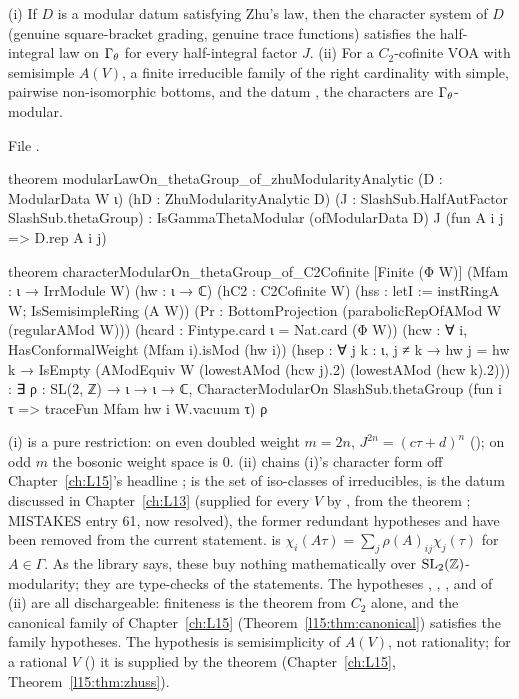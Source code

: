 \begin{theorem}\label{l14:thm:thetaboson}
(i) If $D$ is a modular datum satisfying Zhu's law, then the character system of $D$ (genuine square-bracket grading, genuine
trace functions) satisfies the half-integral law on $\Gamma_\theta$ for every half-integral factor $J$. (ii) For a $C_2$-cofinite VOA
with semisimple $A(V)$, a finite irreducible family of the right cardinality with simple, pairwise non-isomorphic bottoms,
and the datum , the characters are $\Gamma_\theta$-modular.
\end{theorem}
\noindent File .
\begin{leancode}
theorem modularLawOn_thetaGroup_of_zhuModularityAnalytic (D : ModularData W ι)
    (hD : ZhuModularityAnalytic D) (J : SlashSub.HalfAutFactor SlashSub.thetaGroup) :
    IsGammaThetaModular (ofModularData D) J (fun A i j => D.rep A i j)

theorem characterModularOn_thetaGroup_of_C2Cofinite [Finite (Φ W)]
    (Mfam : ι → IrrModule W) (hw : ι → ℂ)
    (hC2 : C2Cofinite W)
    (hss : letI := instRingA W; IsSemisimpleRing (A W))
    (Pr : BottomProjection (parabolicRepOfAMod W (regularAMod W)))
    (hcard : Fintype.card ι = Nat.card (Φ W))
    (hcw : ∀ i, HasConformalWeight (Mfam i).isMod (hw i))
    (hsep : ∀ j k : ι, j ≠ k → hw j = hw k →
      IsEmpty (AModEquiv W (lowestAMod (hcw j).2) (lowestAMod (hcw k).2))) :
    ∃ ρ : SL(2, ℤ) → ι → ι → ℂ,
      CharacterModularOn SlashSub.thetaGroup
        (fun i τ => traceFun Mfam hw i W.vacuum τ) ρ
\end{leancode}
\begin{dictionary}
(i) is a pure restriction: on even doubled weight $m=2n$, $J^{2n} = (c\tau+d)^n$ (); on odd $m$
the bosonic weight space is $0$. (ii) chains (i)'s character form off Chapter~\ref{ch:L15}'s headline
;  is the set of iso-classes of irreducibles, 
is the datum discussed in Chapter~\ref{ch:L13} (supplied for every $V$ by , from the theorem ; MISTAKES entry 61, now resolved),
the former redundant hypotheses  and  have been removed from the current statement.  is $\chi_i(A\tau) =
\sum_j\rho(A)_{ij}\chi_j(\tau)$ for $A\in\Gamma$. As the library says, these buy nothing mathematically over $\mathrm{SL}_2(\mathbb{Z})$-modularity;
they are type-checks of the statements. The hypotheses \lean{[Finite (Φ W)]}, , ,  and
 of (ii) are all dischargeable: finiteness is the theorem  from $C_2$ alone, and
the canonical family of Chapter~\ref{ch:L15} (Theorem~\ref{l15:thm:canonical}) satisfies the family hypotheses. The
hypothesis  is semisimplicity of $A(V)$, not rationality; for a rational $V$ () it is
supplied by the theorem \allowbreak{}\allowbreak{}
(Chapter~\ref{ch:L15}, Theorem~\ref{l15:thm:zhuss}).
\end{dictionary}
